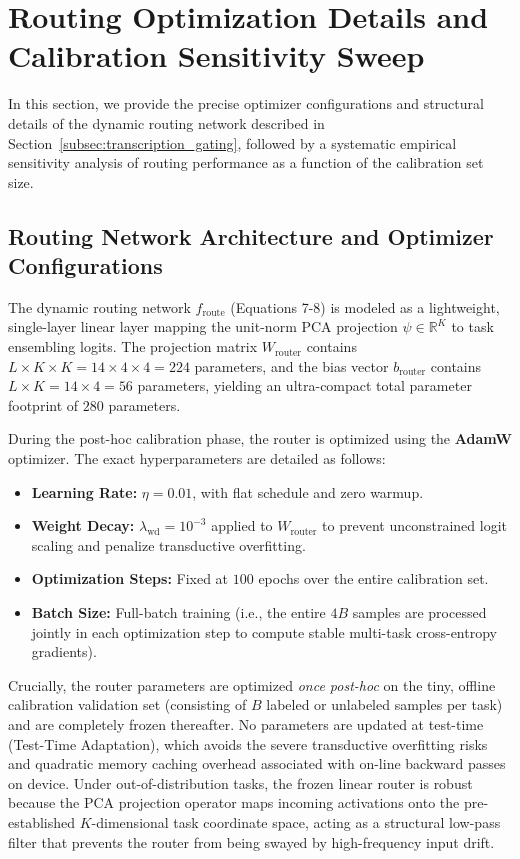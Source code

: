\documentclass{article}
\theoremstyle{plain}
\theoremstyle{definition}
\theoremstyle{remark}
\begin{document}
\section{Routing Optimization Details and Calibration Sensitivity Sweep}
\label{app:routing_optimizer_details}

In this section, we provide the precise optimizer configurations and structural details of the dynamic routing network described in Section~\ref{subsec:transcription_gating}, followed by a systematic empirical sensitivity analysis of routing performance as a function of the calibration set size.

\subsection{Routing Network Architecture and Optimizer Configurations}
The dynamic routing network $f_{\text{route}}$ (Equations 7-8) is modeled as a lightweight, single-layer linear layer mapping the unit-norm PCA projection $\psi \in \mathbb{R}^K$ to task ensembling logits. The projection matrix $W_{\text{router}}$ contains $L \times K \times K = 14 \times 4 \times 4 = 224$ parameters, and the bias vector $b_{\text{router}}$ contains $L \times K = 14 \times 4 = 56$ parameters, yielding an ultra-compact total parameter footprint of $280$ parameters.

During the post-hoc calibration phase, the router is optimized using the \textbf{AdamW} optimizer. The exact hyperparameters are detailed as follows:
\begin{itemize}
\item \textbf{Learning Rate:} $\eta = 0.01$, with flat schedule and zero warmup.
\item \textbf{Weight Decay:} $\lambda_{\text{wd}} = 10^{-3}$ applied to $W_{\text{router}}$ to prevent unconstrained logit scaling and penalize transductive overfitting.
\item \textbf{Optimization Steps:} Fixed at $100$ epochs over the entire calibration set.
\item \textbf{Batch Size:} Full-batch training (i.e., the entire $4B$ samples are processed jointly in each optimization step to compute stable multi-task cross-entropy gradients).
\end{itemize}

Crucially, the router parameters are optimized \textit{once post-hoc} on the tiny, offline calibration validation set (consisting of $B$ labeled or unlabeled samples per task) and are completely frozen thereafter. No parameters are updated at test-time (Test-Time Adaptation), which avoids the severe transductive overfitting risks and quadratic memory caching overhead associated with on-line backward passes on device. Under out-of-distribution tasks, the frozen linear router is robust because the PCA projection operator maps incoming activations onto the pre-established $K$-dimensional task coordinate space, acting as a structural low-pass filter that prevents the router from being swayed by high-frequency input drift.
\end{document}
